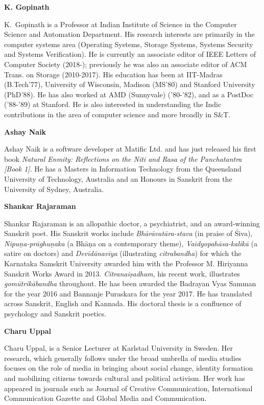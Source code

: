 \bigskip
\hfill {\large\bf K. Gopinath}
\medskip

K.~Gopinath is a Professor at Indian Institute of Science in the Computer Science and
Automation Department. His research interests are primarily in the computer systems area
(Operating Systems, Storage Systems, Systems Security and Systems Verification). He is
currently an associate editor of IEEE Letters of Computer Society (2018-); previously he was
also an associate editor of ACM Trans. on Storage (2010-2017). His education has been at
IIT-Madras (B.Tech'77), University of Wisconsin, Madison (MS'80) and Stanford University
(PhD'88). He has also worked at AMD (Sunnyvale) ('80-'82), and as a PostDoc ('88-'89) at
Stanford. He is also interested in understanding the Indic contributions in the area of
computer science and more broadly in S\&T.

\bigskip
\hfill {\large\bf Ashay Naik}
\medskip

Ashay Naik is a software developer at Matific Ltd. and has just released his first book
\textsl{Natural Enmity: Reflections on the Niti and Rasa of the Panchatantra [Book 1]}. He has a
Masters in Information Technology from the Queensland University of Technology,
Australia and an Honours in Sanskrit from the University of Sydney, Australia.

\bigskip
\hfill {\large\bf Shankar Rajaraman}
\medskip

Shankar Rajaraman is an allopathic doctor, a psychiatrist, and an award-winning Sanskrit
poet. His Sanskrit works include \textsl{Bhārāvatāra-stava} (in praise of Śiva), \textsl{Nipuṇa-prāghuṇaka} (a Bhāṇa on a contemporary theme), \textsl{Vaidyopahāsa-kalikā} (a satire on doctors) and \textsl{Devīdānavīya} (illustrating \textsl{citrabandha}) for which the Karnataka Samskrit University awarded him with the Professor M. Hiriyanna Sanskrit Works Award in 2013. \textsl{Citranaiṣadham}, his recent work, illustrates \textsl{gomūtrikābandha} throughout. He has been awarded the Badrayan Vyas Samman for the year 2016 and Bannanje Puraskara
for the year 2017. He has translated across Sanskrit, English and Kannada. His doctoral thesis is a confluence of psychology and Sanskrit poetics.

\bigskip
\hfill {\large\bf Charu Uppal}
\medskip

Charu Uppal, is a Senior Lecturer at Karlstad University in Sweden. Her research, which generally follows under the broad umbrella of media studies focuses on the role of media in bringing about social change, identity formation and mobilizing citizens towards cultural and political activism. Her work has appeared in journals such as Journal of Creative Communication, International Communication Gazette and Global Media and Communication.
